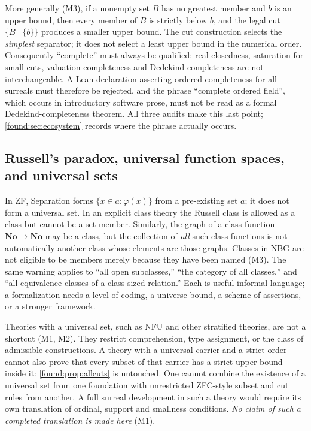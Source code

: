 \documentclass[11pt,letterpaper]{article}
\numberwithin{equation}{section}
\theoremstyle{definition}
\theoremstyle{remark}
\newcommand{\No}{\mathbf{No}}
\begin{document}
More generally (M3), if a nonempty set $B$ has no greatest member and $b$ is an
upper bound, then every member of $B$ is strictly below $b$, and the legal cut
$\{B\mid\{b\}\}$ produces a smaller upper bound. The cut construction selects
the \emph{simplest} separator; it does not select a least upper bound in the
numerical order. Consequently ``complete'' must always be qualified: real
closedness, saturation for small cuts, valuation completeness and Dedekind
completeness are not interchangeable. A Lean declaration asserting
ordered-completeness for all surreals must therefore be rejected, and the phrase
``complete ordered field'', which occurs in introductory software prose, must
not be read as a formal Dedekind-completeness theorem. All three audits make
this last point; \cref{found:sec:ecosystem} records where the phrase actually
occurs.

\subsection{Russell's paradox, universal function spaces, and universal sets}
\label{found:sub:russell}
In ZF, Separation forms $\{x\in a:\varphi(x)\}$ from a pre-existing set $a$; it
does not form a universal set. In an explicit class theory the Russell class is
allowed as a class but cannot be a set member. Similarly, the graph of a class
function $\No\to\No$ may be a class, but the collection of \emph{all} such
class functions is not automatically another class whose elements are those
graphs. Classes in NBG are not eligible to be members merely because they have
been named (M3). The same warning applies to ``all open subclasses,'' ``the
category of all classes,'' and ``all equivalence classes of a class-sized
relation.'' Each is useful informal language; a formalization needs a level of
coding, a universe bound, a scheme of assertions, or a stronger framework.

Theories with a universal set, such as NFU and other stratified theories, are
not a shortcut (M1, M2). They restrict comprehension, type assignment, or the
class of admissible constructions. A theory with a universal carrier and a
strict order cannot also prove that every subset of that carrier has a strict
upper bound inside it: \cref{found:prop:allcuts} is untouched. One cannot
combine the existence of a universal set from one foundation with unrestricted
ZFC-style subset and cut rules from another. A full surreal development in such
a theory would require its own translation of ordinal, support and smallness
conditions. \emph{No claim of such a completed translation is made here} (M1).
\end{document}
